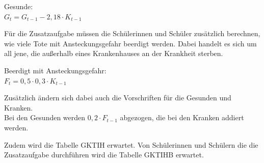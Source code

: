 Gesunde:\\
$ G_t = G_{t-1}-2,18 \cdot K_{t-1}$

Für die Zusatzaufgabe müssen die Schülerinnen und Schüler zusätzlich berechnen, wie viele Tote mit Ansteckungsgefahr beerdigt werden. Dabei handelt es sich um all jene, die außerhalb eines Krankenhauses an der Krankheit sterben.

Beerdigt mit Ansteckungsgefahr:\\
$F_t = 0,5 \cdot 0,3 \cdot K_{t-1}$

Zusätzlich ändern sich dabei auch die Vorschriften für die Gesunden und Kranken.\\
Bei den Gesunden werden $0,2 \cdot F_{t-1}$ abgezogen, die bei den Kranken addiert werden. 

 Zudem wird die Tabelle GKTIH erwartet. Von Schülerinnen und Schülern die die Zusatzaufgabe durchführen wird die Tabelle GKTIHB erwartet.
